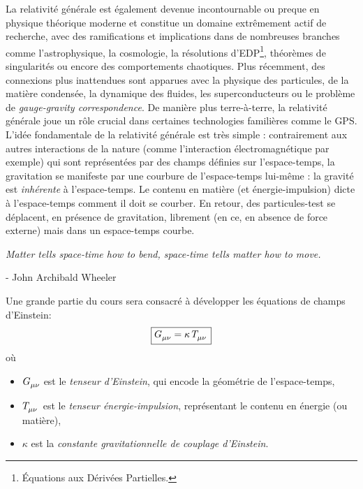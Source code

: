 La relativité générale est également devenue incontournable ou preque en physique théorique moderne et constitue un domaine extrêmement actif de recherche, avec des ramifications et implications dans de nombreuses branches comme l'astrophysique, la cosmologie, la résolutions d'EDP\footnote{Équations aux Dérivées Partielles.}, théorèmes de singularités ou encore des comportements chaotiques. Plus récemment, des connexions plus inattendues sont apparues avec la physique des particules, de la matière condensée, la dynamique des fluides, les superconducteurs ou le problème de \emph{gauge-gravity correspondence}. De manière plus terre-à-terre, la relativité générale joue un rôle crucial dans certaines technologies familières comme le GPS. \\

L'idée fondamentale de la relativité générale est très simple : contrairement aux autres interactions de la nature (comme l'interaction électromagnétique par exemple) qui sont représentées par des champs définies sur l'espace-temps, la gravitation se manifeste par une courbure de l'espace-temps lui-même : la gravité est \emph{inhérente} à l'espace-temps. Le contenu en matière (et énergie-impulsion) dicte à l'espace-temps comment il doit se courber. En retour, des particules-test se déplacent, en présence de gravitation, librement (en ce, en absence de force externe) mais dans un espace-temps courbe. 
\begin{center}
    \textit{Matter tells space-time how to bend, space-time tells matter how to move.}
\end{center}
\begin{flushright}
    - John Archibald Wheeler
\end{flushright}




Une grande partie du cours sera consacré à développer les équations de champs d'Einstein: 
\begin{align}
    \label{eq:Einstein introduction}
    \boxed{G\indices{_\mu_\nu} = \kappa \, T\indices{_\mu _\nu}}
\end{align}
où 
\begin{itemize}
    \item $G\indices{_\mu _\nu}$ est le \emph{tenseur d'Einstein}, qui encode la géométrie de l'espace-temps,
    \item  $T\indices{_\mu _\nu}$ est le \emph{tenseur énergie-impulsion}, représentant le contenu en énergie (ou matière),
    \item $\kappa$ est la \emph{constante gravitationnelle de couplage d'Einstein}.
\end{itemize}

